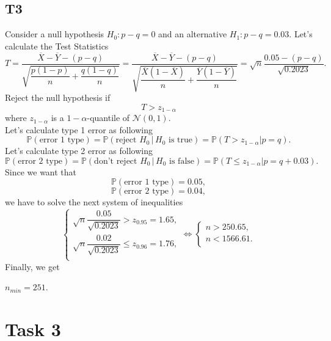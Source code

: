 \documentclass[a4paper, 12pt]{article}
\renewcommand*{\P}{\mathbb{P}}
\begin{document}
\subsection*{T3}
Consider a null hypothesis $H_0: p - q = 0$ and an alternative $H_1: p - q = 0.03.$ Let's calculate the Test Statistics
$$
T = \dfrac{\overline{X} - \overline{Y} - (p - q)}{\sqrt{\dfrac{p(1-p)}{n} + \dfrac{q(1-q)}{n}}} = \dfrac{\overline{X} - \overline{Y} - (p - q)}{\sqrt{\dfrac{\overline{X}(1-\overline{X})}{n} + \dfrac{\overline{Y}(1-\overline{Y})}{n}}} = \sqrt{n} \dfrac{0.05 - (p-q)}{\sqrt{0.2023}}.
$$
Reject the null hypothesis if 
$$
T > z_{1-\alpha}
$$ 
where $z_{1-\alpha}$ is a $1-\alpha$-quantile of $\mathcal{N}(0, 1).$ \\
Let's calculate type 1 error as following
$$
\P(\text{error 1 type}) = \P (\text{reject }H_0 \, | \, H_0 \text{ is true}) = \P(T > z_{1-\alpha} | p = q).
$$
Let's calculate type 2 error as following
$$
\P(\text{error 2 type}) = \P (\text{don't reject }H_0 \, | \, H_0 \text{ is false}) = \P(T \leqslant z_{1-\alpha} | p = q + 0.03).
$$
Since we want that
$$
\P(\text{error 1 type}) = 0.05,
$$
$$
\P(\text{error 2 type}) = 0.04,
$$
we have to solve the next system of inequalities
$$
\begin{cases}
\sqrt{n} \dfrac{0.05}{\sqrt{0.2023}} > z_{0.95} = 1.65, \\
\sqrt{n} \dfrac{0.02}{\sqrt{0.2023}} \leqslant z_{0.96} = 1.76, \\
\end{cases}
\Leftrightarrow
\begin{cases}
n > 250.65, \\
n < 1566.61. \\
\end{cases}
$$
Finally, we get
\begin{tcolorbox}
[enhanced,width=\textwidth,center upper,
 fontupper=\large\bfseries,
 drop fuzzy shadow southeast,
 colframe=red!50!black,colback=yellow!25]
$
n_{min} = 251.
$
\end{tcolorbox}

\section*{Task 3}
\end{document}
